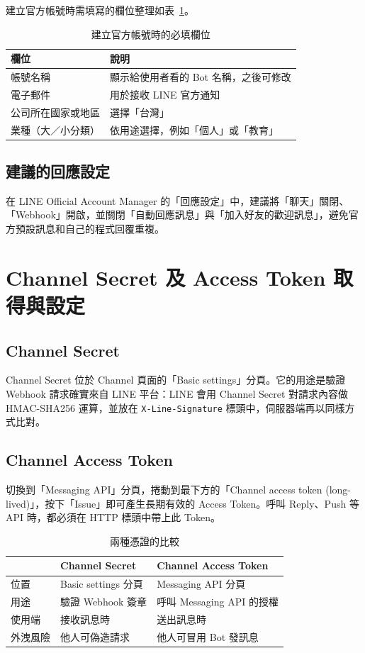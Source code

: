 \documentclass[12pt,a4paper]{report}
\begin{document}
建立官方帳號時需填寫的欄位整理如表~\ref{tab:fields}。

\begin{table}[htbp]
  \centering
  \caption{建立官方帳號時的必填欄位}
  \label{tab:fields}
  \begin{tabularx}{0.9\textwidth}{lX}
    \toprule
    \textbf{欄位} & \textbf{說明} \\
    \midrule
    帳號名稱 & 顯示給使用者看的 Bot 名稱，之後可修改 \\
    電子郵件 & 用於接收 LINE 官方通知 \\
    公司所在國家或地區 & 選擇「台灣」 \\
    業種（大／小分類） & 依用途選擇，例如「個人」或「教育」 \\
    \bottomrule
  \end{tabularx}
\end{table}

\section{建議的回應設定}
在 LINE Official Account Manager 的「回應設定」中，建議將「聊天」關閉、「Webhook」開啟，並關閉「自動回應訊息」與「加入好友的歡迎訊息」，避免官方預設訊息和自己的程式回覆重複。

\chapter{Channel Secret 及 Access Token 取得與設定}

\section{Channel Secret}
Channel Secret 位於 Channel 頁面的「Basic settings」分頁。它的用途是驗證 Webhook 請求確實來自 LINE 平台：LINE 會用 Channel Secret 對請求內容做 HMAC-SHA256 運算，並放在 \texttt{X-Line-Signature} 標頭中，伺服器端再以同樣方式比對。

\section{Channel Access Token}
切換到「Messaging API」分頁，捲動到最下方的「Channel access token (long-lived)」，按下「Issue」即可產生長期有效的 Access Token。呼叫 Reply、Push 等 API 時，都必須在 HTTP 標頭中帶上此 Token。

\begin{table}[htbp]
  \centering
  \caption{兩種憑證的比較}
  \label{tab:cred}
  \begin{tabularx}{0.95\textwidth}{lXX}
    \toprule
     & \textbf{Channel Secret} & \textbf{Channel Access Token} \\
    \midrule
    位置 & Basic settings 分頁 & Messaging API 分頁 \\
    用途 & 驗證 Webhook 簽章 & 呼叫 Messaging API 的授權 \\
    使用端 & 接收訊息時 & 送出訊息時 \\
    外洩風險 & 他人可偽造請求 & 他人可冒用 Bot 發訊息 \\
    \bottomrule
  \end{tabularx}
\end{table}
\end{document}

